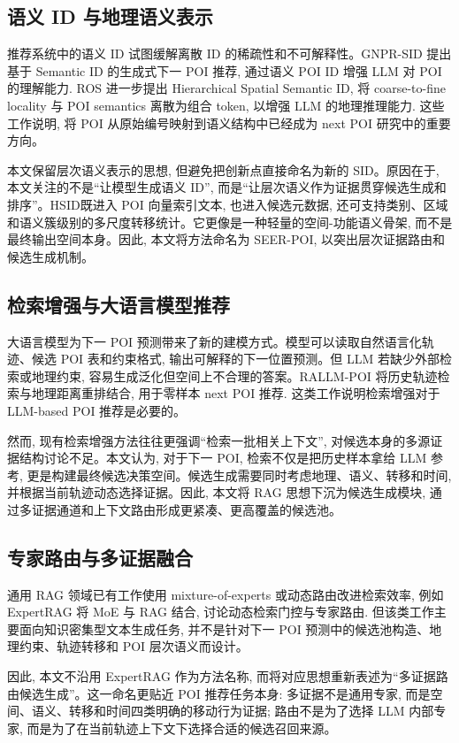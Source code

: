 \documentclass[10pt,twocolumn,fontset=none]{ctexart}
\newcommand{\method}{SEER-POI}
\newcommand{\hsid}{HSID}
\begin{document}
\subsection{语义 ID 与地理语义表示}
推荐系统中的语义 ID 试图缓解离散 ID 的稀疏性和不可解释性。GNPR-SID 提出基于 Semantic ID 的生成式下一 POI 推荐, 通过语义 POI ID 增强 LLM 对 POI 的理解能力\cite{gnprsid}. ROS 进一步提出 Hierarchical Spatial Semantic ID, 将 coarse-to-fine locality 与 POI semantics 离散为组合 token, 以增强 LLM 的地理推理能力\cite{ros}. 这些工作说明, 将 POI 从原始编号映射到语义结构中已经成为 next POI 研究中的重要方向。

本文保留层次语义表示的思想, 但避免把创新点直接命名为新的 SID。原因在于, 本文关注的不是“让模型生成语义 ID”, 而是“让层次语义作为证据贯穿候选生成和排序”。\hsid 既进入 POI 向量索引文本, 也进入候选元数据, 还可支持类别、区域和语义簇级别的多尺度转移统计。它更像是一种轻量的空间-功能语义骨架, 而不是最终输出空间本身。因此, 本文将方法命名为 \method, 以突出层次证据路由和候选生成机制。

\subsection{检索增强与大语言模型推荐}
大语言模型为下一 POI 预测带来了新的建模方式。模型可以读取自然语言化轨迹、候选 POI 表和约束格式, 输出可解释的下一位置预测。但 LLM 若缺少外部检索或地理约束, 容易生成泛化但空间上不合理的答案。RALLM-POI 将历史轨迹检索与地理距离重排结合, 用于零样本 next POI 推荐\cite{rallmpoi}. 这类工作说明检索增强对于 LLM-based POI 推荐是必要的。

然而, 现有检索增强方法往往更强调“检索一批相关上下文”, 对候选本身的多源证据结构讨论不足。本文认为, 对于下一 POI, 检索不仅是把历史样本拿给 LLM 参考, 更是构建最终候选决策空间。候选生成需要同时考虑地理、语义、转移和时间, 并根据当前轨迹动态选择证据。因此, 本文将 RAG 思想下沉为候选生成模块, 通过多证据通道和上下文路由形成更紧凑、更高覆盖的候选池。

\subsection{专家路由与多证据融合}
通用 RAG 领域已有工作使用 mixture-of-experts 或动态路由改进检索效率, 例如 ExpertRAG 将 MoE 与 RAG 结合, 讨论动态检索门控与专家路由\cite{expertrag}. 但该类工作主要面向知识密集型文本生成任务, 并不是针对下一 POI 预测中的候选池构造、地理约束、轨迹转移和 POI 层次语义而设计。

因此, 本文不沿用 ExpertRAG 作为方法名称, 而将对应思想重新表述为“多证据路由候选生成”。这一命名更贴近 POI 推荐任务本身: 多证据不是通用专家, 而是空间、语义、转移和时间四类明确的移动行为证据; 路由不是为了选择 LLM 内部专家, 而是为了在当前轨迹上下文下选择合适的候选召回来源。
\end{document}
